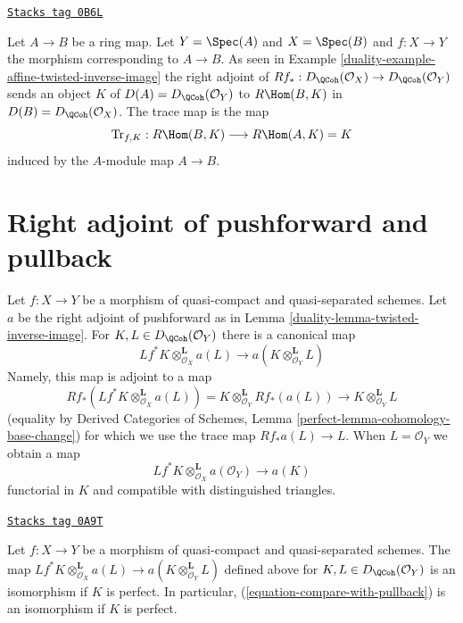 \begin{example}
\label{duality-example-trace-affine}
\href{https://stacks.math.columbia.edu/tag/0B6L}{\texttt{Stacks tag 0B6L}}

Let $A \to B$ be a ring map. Let $Y = \Spec(A)$ and $X = \Spec(B)$
and $f : X \to Y$ the morphism corresponding to $A \to B$. As seen
in Example \ref{duality-example-affine-twisted-inverse-image}
the right adjoint of
$Rf_* : D_\QCoh(\mathcal{O}_X) \to D_\QCoh(\mathcal{O}_Y)$
sends an object $K$ of $D(A) = D_\QCoh(\mathcal{O}_Y)$ to $R\Hom(B, K)$ in
$D(B) = D_\QCoh(\mathcal{O}_X)$. The trace map is the map
$$
\text{Tr}_{f, K} : R\Hom(B, K) \longrightarrow R\Hom(A, K) = K
$$
induced by the $A$-module map $A \to B$.
\end{example}

\section{Right adjoint of pushforward and pullback}
\label{duality-section-compare-with-pullback}
Let $f : X \to Y$ be a morphism of quasi-compact and quasi-separated
schemes. Let $a$ be the right adjoint of pushforward as in
Lemma \ref{duality-lemma-twisted-inverse-image}. For $K, L \in D_\QCoh(\mathcal{O}_Y)$
there is a canonical map
$$
Lf^*K \otimes^\mathbf{L}_{\mathcal{O}_X} a(L)
\longrightarrow
a(K \otimes_{\mathcal{O}_Y}^\mathbf{L} L)
$$
Namely, this map is adjoint to a map
$$
Rf_*(Lf^*K \otimes^\mathbf{L}_{\mathcal{O}_X} a(L)) =
K \otimes^\mathbf{L}_{\mathcal{O}_Y} Rf_*(a(L))
\longrightarrow
K \otimes^\mathbf{L}_{\mathcal{O}_Y} L
$$
(equality by Derived Categories of Schemes, Lemma
\ref{perfect-lemma-cohomology-base-change})
for which we use the trace map $Rf_*a(L) \to L$.
When $L = \mathcal{O}_Y$ we obtain a map
\begin{equation}
\label{equation-compare-with-pullback}
Lf^*K \otimes^\mathbf{L}_{\mathcal{O}_X} a(\mathcal{O}_Y) \longrightarrow a(K)
\end{equation}
functorial in $K$ and compatible with distinguished triangles.

\begin{lemma}
\label{duality-lemma-compare-with-pullback-perfect}
\href{https://stacks.math.columbia.edu/tag/0A9T}{\texttt{Stacks tag 0A9T}}

Let $f : X \to Y$ be a morphism of quasi-compact and quasi-separated
schemes. The map
$Lf^*K \otimes^\mathbf{L}_{\mathcal{O}_X} a(L) \to
a(K \otimes_{\mathcal{O}_Y}^\mathbf{L} L)$
defined above for $K, L \in D_\QCoh(\mathcal{O}_Y)$
is an isomorphism if $K$ is perfect. In particular,
(\ref{equation-compare-with-pullback}) is an isomorphism if $K$ is perfect.
\end{lemma}

